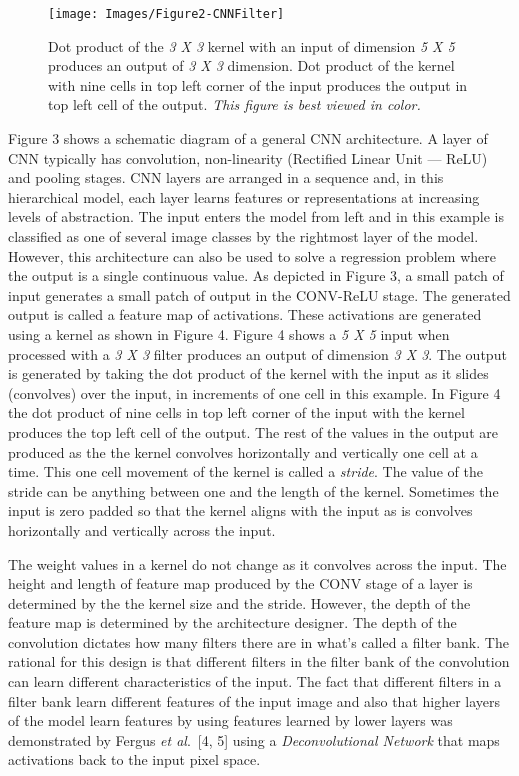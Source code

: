 \documentclass [11pt,letterpaper ,twoside ,openany ]{report}
\begin{document}
    \begin{wrapfigure}{l}{0.5\textwidth}
        \begin{center}
            \texttt{[image: Images/Figure2-CNNFilter]}
        \end{center}
        \caption{Dot product of the \textit{3 X 3} kernel with an input of dimension \textit{5 X 5} produces an output of \textit{3 X 3} dimension. Dot product of the kernel with nine cells in top left corner of the input produces the output in top left cell of the output. \textit{This figure is best viewed in color.}}
    \end{wrapfigure}    

    Figure 3 shows a schematic diagram of a general CNN architecture. A layer of CNN typically has convolution, non-linearity (Rectified Linear Unit --- ReLU) and pooling stages. CNN layers are arranged in a sequence and, in this hierarchical model, each layer learns features or representations at increasing levels of abstraction. The input enters the model from left and in this example is classified as one of several image classes by the rightmost layer of the model. However, this architecture can also be used to solve a regression problem where the output is a single continuous value. As depicted in Figure 3, a small patch of input generates a small patch of output in the CONV-ReLU stage. The generated output is called a feature map of activations. These activations are generated using a kernel as shown in Figure 4. Figure 4 shows a \textit{5 X 5} input when processed with a  \textit{3 X 3} filter produces an output of dimension \textit{3 X 3}. The output is generated by taking the dot product of the kernel with the input as it slides (convolves) over the input, in increments of one cell in this example. In Figure 4 the dot product of nine cells in top left corner of the input with the kernel produces the top left cell of the output. The rest of the values in the output are produced as the the kernel convolves horizontally and vertically one cell at a time. This one cell movement of the kernel is called a \textit{stride}. The value of the stride can be anything between one and the length of the kernel. Sometimes the input is zero padded so that the kernel aligns with the input as is convolves horizontally and vertically across the input.

    The weight values in a kernel do not change as it convolves across the input. The height and length of feature map produced by the  CONV stage of a layer is determined by the the kernel size and the stride. However, the depth of the feature map is determined by the architecture designer. The depth of the convolution dictates how many filters there are in what's called a filter bank. The rational for this design is that different filters in the filter bank of the convolution can learn different characteristics of the input. The fact that different filters in a filter bank learn different features of the input image and also that higher layers of the model learn features by using features learned by lower layers was demonstrated by Fergus \textit{et al}.\ [4, 5] using a \textit{Deconvolutional Network} that maps activations back to the input pixel space. 
\end{document}
